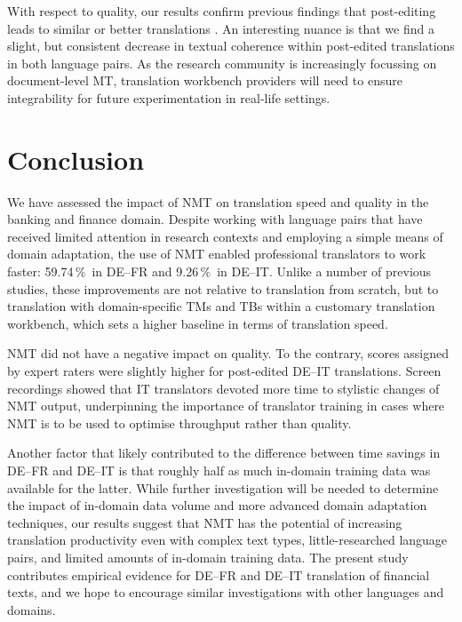\documentclass[11pt]{article}
\newcommand{\eg}{e.\,g.,\ }
\newcommand{\percent}{\,\%\ }
\begin{document}
With respect to quality, our results confirm previous findings that post-editing leads to similar or better translations \citep[\eg][]{Green2013}. An interesting nuance is that we find a slight, but consistent decrease in textual coherence within post-edited translations in both language pairs. As the research community is increasingly focussing on document-level MT, translation workbench providers will need to ensure integrability for future experimentation in real-life settings.

\section{Conclusion}
\label{sec:Conclusion}

We have assessed the impact of NMT on translation speed and quality in the banking and finance domain. Despite working with language pairs that have received limited attention in research contexts and employing a simple means of domain adaptation, the use of NMT enabled professional translators to work faster: 59.74\percent in DE--FR and 9.26\percent in DE--IT. Unlike a number of previous studies, these improvements are not relative to translation from scratch, but to translation with domain-specific TMs and TBs within a customary translation workbench, which sets a higher baseline in terms of translation speed.

NMT did not have a negative impact on quality. To the contrary, scores assigned by expert raters were slightly higher for post-edited DE--IT translations. Screen recordings showed that IT translators devoted more time to stylistic changes of NMT output, underpinning the importance of translator training in cases where NMT is to be used to optimise throughput rather than quality.

Another factor that likely contributed to the difference between time savings in DE--FR and DE--IT is that roughly half as much in-domain training data was available for the latter. While further investigation will be needed to determine the impact of in-domain data volume and more advanced domain adaptation techniques, our results suggest that NMT has the potential of increasing translation productivity even with complex text types, little-researched language pairs, and limited amounts of in-domain training data. The present study contributes empirical evidence for DE--FR and DE--IT translation of financial texts, and we hope to encourage similar investigations with other languages and domains.
\end{document}
